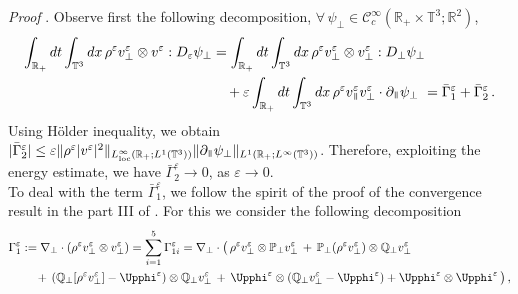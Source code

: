 \documentclass[11pt,reqno]{amsart}
\def\namedproof{\par{\vspace{0.5em}\it Proof} \ignorespaces}
\def \R{{\mathbb{R}}}
\def \Q{{\mathbb{Q}}}
\def \T{{\mathbb{T}}}
\def \P{{\mathbb{P}}}
\newcommand{\myparallel}{{\mkern3mu\vphantom{\perp}\vrule depth 0pt\mkern2mu\vrule depth 0pt\mkern3mu}}
\begin{document}
\namedproof{\textit{of Lemma~\ref{lem:RST}}}.
Observe first the following decomposition, $\forall \,\psi_\perp \in \mathscr{C}_c^\infty(\R_+\times \T^3;\R^2)$, 
\begin{equation}
  \label{eq:RST-1}
  \begin{aligned}
  \int_{\R_+}  dt \int_{\T^3}dx \, \rho^\varepsilon v_\perp^\varepsilon \otimes v^\varepsilon : D_\varepsilon\psi_\perp
  &= \int_{\R_+}  dt \int_{\T^3}dx \, \rho^\varepsilon v_\perp^\varepsilon \otimes v_\perp^\varepsilon : D_\perp\psi_\perp \\
  &\quad + \varepsilon\int_{\R_+}  dt \int_{\T^3}dx \, \rho^\varepsilon v_\myparallel^\varepsilon v_\perp^\varepsilon \cdot \partial_\myparallel\psi_\perp 
  \ =  \bar{\Gamma}_{1}^\varepsilon + \bar \Gamma_{2}^\varepsilon\,. 
  \end{aligned}
\end{equation}  
Using H\"older  inequality, we obtain $ |\bar \Gamma_{2}^\varepsilon| \leq \varepsilon \|\rho^\varepsilon |v^\varepsilon|^2 \|_{L_{\rm loc}^\infty(\R_+;L^1(\T^3))} \|\partial_\myparallel \psi_\perp \|_{L^1(\R_+;L^\infty(\T^3))}$. Therefore, exploiting the energy estimate, we have $\bar \Gamma_{2}^\varepsilon \rightarrow 0$, as $\varepsilon \rightarrow 0$. \\
To deal with the term $\bar \Gamma_{1}^\varepsilon$, we follow the spirit of the proof of the convergence result in the part III of \cite{LM98}. For this we consider the following decomposition
\begin{equation}
  \label{eq:RST-2}
  \begin{aligned}
    \Gamma_{1}^\varepsilon & :=\nabla _\perp \cdot (\rho^\varepsilon v_\perp^\varepsilon \otimes v_\perp^\varepsilon ) =  \sum_{i=1}^5 \Gamma_{1i}^\varepsilon
     = \nabla _\perp \cdot \big (\,\rho^\varepsilon v_\perp^\varepsilon \otimes\P_\perp v_\perp^\varepsilon
     \, +\,  \P_\perp(\rho^\varepsilon v_\perp^\varepsilon) \otimes\Q_\perp v_\perp^\varepsilon \\
     &\quad \, + \, 
    (\Q_\perp[\rho^\varepsilon v_\perp^\varepsilon]-\Upphi^\varepsilon) \otimes \Q_\perp v_\perp^\varepsilon 
    \, +\,  \Upphi^\varepsilon\otimes (\Q_\perp v_\perp^\varepsilon-\Upphi^\varepsilon) + \Upphi^\varepsilon\otimes\Upphi^\varepsilon\, \bigr) \,,
\end{aligned}
\end{equation}
\end{document}

